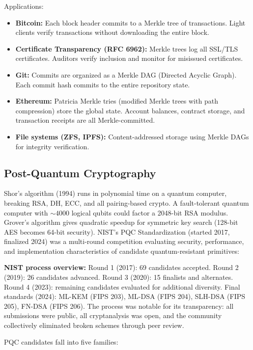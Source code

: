 Applications:
\begin{itemize}
\item \textbf{Bitcoin:} Each block header commits to a Merkle tree of transactions. Light clients verify transactions without downloading the entire block.
\item \textbf{Certificate Transparency (RFC 6962):} Merkle trees log all SSL/TLS certificates. Auditors verify inclusion and monitor for misissued certificates.
\item \textbf{Git:} Commits are organized as a Merkle DAG (Directed Acyclic Graph). Each commit hash commits to the entire repository state.
\item \textbf{Ethereum:} Patricia Merkle tries (modified Merkle trees with path compression) store the global state. Account balances, contract storage, and transaction receipts are all Merkle-committed.
\item \textbf{File systems (ZFS, IPFS):} Content-addressed storage using Merkle DAGs for integrity verification.
\end{itemize}

\subsection{Post-Quantum Cryptography}
\label{sec:crypto:pqc}

Shor's algorithm (1994) runs in polynomial time on a quantum computer, breaking RSA, DH, ECC, and all pairing-based crypto. A fault-tolerant quantum computer with $\sim 4000$ logical qubits could factor a 2048-bit RSA modulus. Grover's algorithm gives quadratic speedup for symmetric key search (128-bit AES becomes 64-bit security). NIST's PQC Standardization (started 2017, finalized 2024) was a multi-round competition evaluating security, performance, and implementation characteristics of candidate quantum-resistant primitives:

\textbf{NIST process overview:} Round 1 (2017): 69 candidates accepted. Round 2 (2019): 26 candidates advanced. Round 3 (2020): 15 finalists and alternates. Round 4 (2023): remaining candidates evaluated for additional diversity. Final standards (2024): ML-KEM (FIPS 203), ML-DSA (FIPS 204), SLH-DSA (FIPS 205), FN-DSA (FIPS 206). The process was notable for its transparency: all submissions were public, all cryptanalysis was open, and the community collectively eliminated broken schemes through peer review.

PQC candidates fall into five families:

